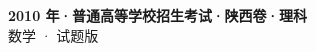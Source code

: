 \documentclass[zihao=-4, a4paper]{ctexart}
\begin{document}
\begin{center}
  {\Large\bfseries 2010 年·普通高等学校招生考试·陕西卷·理科}\\[4pt]
  {\large 数学 · 试题版}
\end{center}
\medskip
{}

\end{document}
